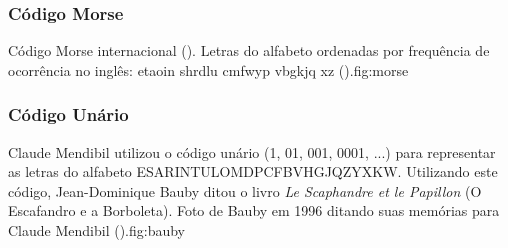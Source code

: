 \begin{frame}%
  \frametitle{Código Morse}
  {Código Morse internacional (\cite{wiki:morse}). Letras do alfabeto ordenadas por frequência de ocorrência no inglês: etaoin shrdlu cmfwyp vbgkjq xz (\cite{wiki:etaoin,wiki:letterfreq}).}{fig:morse}
\end{frame}

\begin{frame}%
  \frametitle{Código Unário}
  Claude Mendibil utilizou o código unário (1, 01, 001, 0001, ...) 
  para representar as letras do alfabeto ESARINTULOMDPCFBVHGJQZYXKW.
  Utilizando este código, Jean-Dominique Bauby ditou o livro \textit{Le Scaphandre et le Papillon} (O Escafandro e a Borboleta).
  {Foto de Bauby em 1996 ditando suas memórias para Claude Mendibil (\cite{wiki:bauby}).}{fig:bauby}
\end{frame}

